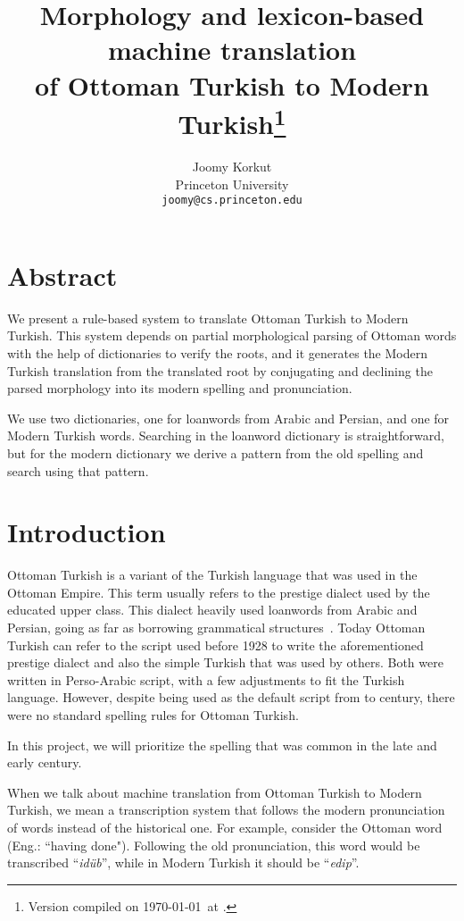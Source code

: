 \documentclass[10pt,twocolumn]{article}
\title{Morphology and lexicon-based machine translation\\of Ottoman Turkish to Modern Turkish\footnote{Version compiled on \today\ at \currenttime.}}
\author{
  Joomy Korkut\\
  \normalsize Princeton University\\
  \normalsize \texttt{joomy@cs.princeton.edu}
}
\date{}
\theoremstyle{nonumberplain}
\newcommand{\otto}[1]{\RLE{\ottoman{}\Large{}#1}}
\newcommand{\word}[1]{``\emph{#1}''}
\begin{document}
\setlength{\abovedisplayskip}{-17pt}
\setlength{\belowdisplayskip}{0pt}
\setlength{\abovedisplayshortskip}{0pt}
\setlength{\belowdisplayshortskip}{0pt}

\maketitle

\section*{Abstract}
We present a rule-based system to translate Ottoman Turkish to Modern Turkish.
This system depends on partial morphological parsing of Ottoman words with the help of
dictionaries to verify the roots, and it generates the Modern Turkish
translation from the translated root by conjugating and declining the parsed
morphology into its modern spelling and pronunciation.

We use two dictionaries, one for loanwords from Arabic and
Persian, and one for Modern Turkish words. Searching in the loanword dictionary
is straightforward, but for the modern dictionary we derive a pattern from the
old spelling and search using that pattern.

\section{Introduction}

Ottoman Turkish is a variant of the Turkish language that was used in the
Ottoman Empire. This term usually refers to the prestige dialect used by the
educated upper class. This dialect heavily used loanwords from Arabic and
Persian, going as far as borrowing grammatical
structures~\cite{redhouse1884simplified, hagopian1907ottoman, strauss2011linguistic}.
Today Ottoman Turkish can refer to the script used before 1928 to write the
aforementioned prestige dialect and also the simple Turkish that was used by
others. Both were written in Perso-Arabic script, with a few adjustments to fit
the Turkish language.
However, despite being used as the default script from  to 
century, there were no standard spelling rules for Ottoman Turkish.

In this project, we will prioritize the spelling that was common
in the late  and early  century.

When we talk about machine translation from Ottoman Turkish to Modern Turkish,
we mean a transcription system that follows the modern pronunciation of words
instead of the historical one.
For example, consider the Ottoman word \otto{ايدوب} (Eng.: ``having done").
Following the old pronunciation, this word would be transcribed \word{idüb}, while
in Modern Turkish it should be \word{edip}.
\end{document}

